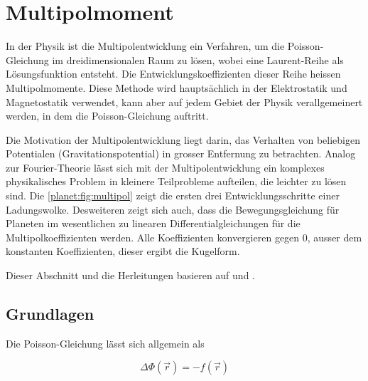 %
%
%
%
\section{Multipolmoment
\label{planet:section:multipol}}
In der Physik ist die Multipolentwicklung ein Verfahren, um die Poisson-Gleichung im dreidimensionalen Raum zu lösen, wobei eine Laurent-Reihe als Lösungsfunktion entsteht.
%
%
Die Entwicklungskoeffizienten dieser Reihe heissen Multipolmomente.
Diese Methode wird hauptsächlich in der Elektrostatik und Magnetostatik verwendet, kann aber auf jedem Gebiet der Physik verallgemeinert werden, in dem die Poisson-Gleichung auftritt.

Die Motivation der Multipolentwicklung liegt darin, das Verhalten von beliebigen Potentialen (Gravitationspotential) in grosser Entfernung zu betrachten.
Analog zur Fourier-Theorie lässt sich mit der Multipolentwicklung ein komplexes physikalisches Problem in kleinere Teilprobleme aufteilen, die leichter zu lösen sind.
Die \cref{planet:fig:multipol} zeigt die ersten drei Entwicklungsschritte einer Ladungswolke.
Desweiteren zeigt sich auch, dass die Bewegungsgleichung für Planeten im wesentlichen zu linearen Differentialgleichungen für die Multipolkoeffizienten werden.
Alle Koeffizienten konvergieren gegen 0, ausser dem konstanten Koeffizienten, dieser ergibt die Kugelform.

Dieser Abschnitt und die Herleitungen basieren auf \cite{planet:multi} und \cite{planet:quadro}.

%

\subsection{Grundlagen
\label{planet:subsection:grundlagen}}

Die Poisson-Gleichung lässt sich allgemein als

\begin{equation*}
\Delta \Phi (\vec{r}) = - f (\vec{r})
\end{equation*}

